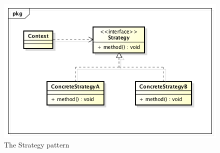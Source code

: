 \documentclass[../main/main.tex]{subfiles}
\begin{document}
\begin{figure}
  \includegraphics{../figures/strategy.png}  
  \caption{The Strategy pattern}
  \label{fig:strategy}
\end{figure}

\end{document}
